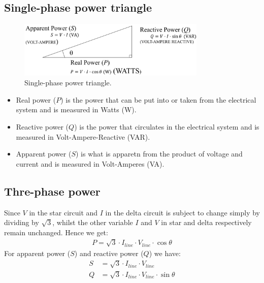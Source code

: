 \documentclass[class=report, crop=false, 12pt,a4paper]{standalone}
\begin{document}
\subsection{Single-phase power triangle}
\begin{figure}[H]
	\centering
	\includegraphics[width = 0.8\textwidth]{../img/figure10.png}
	\caption{Single-phase power triangle.}
\end{figure}
\begin{itemize}
	\item Real power ($P$) is the power that can be put into or taken from the electrical system and is measured in Watts (\si{\watt}).
	\item Reactive power ($Q$) is the power that circulates in the electrical system and is measured in Volt-Ampere-Reactive (VAR).
	\item Apparent power ($S$) is what is apparetn from the product of voltage and current and is measured in Volt-Amperes (VA).
\end{itemize}
\subsection{Thre-phase power}
Since $V$ in the star circuit and $I$ in the delta circuit is subject to change simply by dividing by $\sqrt{3}$, whilst the other variable $I$ and $V$ in star and delta respectively remain unchanged. Hence we get:
\begin{gather}
	P = \sqrt{3} \cdot I_{line} \cdot V_{line} \cdot \cos \theta
\end{gather}
For apparent power ($S$) and reactive power ($Q$) we have:
\begin{align}
	S &= \sqrt{3} \cdot I_{line} \cdot V_{line}\\
	Q &= \sqrt{3} \cdot I_{line} \cdot V_{line} \cdot \sin \theta
\end{align}
\end{document}
